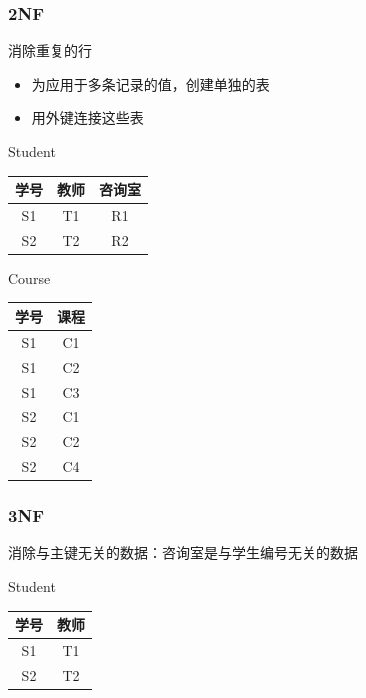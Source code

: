 \documentclass[11pt,journal,compsoc]{IEEEtran}
\begin{document}
\subsubsection{2NF}

消除重复的行

\begin{itemize}
    \item 为应用于多条记录的值，创建单独的表
    \item 用外键连接这些表
\end{itemize}

Student

\begin{table}[H]
    \centering
    \begin{tabular}{|c|c|c|}
        \hline
        学号 & 教师 & 咨询室 \\
        \hline
        S1 & T1 & R1 \\
        \hline
        S2 & T2 & R2 \\
        \hline
    \end{tabular}
\end{table}

Course

\begin{table}[H]
    \centering
    \begin{tabular}{|c|c|}
        \hline
        学号 & 课程 \\
        \hline
        S1 & C1 \\
        \hline
        S1 & C2 \\
        \hline
        S1 & C3 \\
        \hline
        S2 & C1 \\
        \hline
        S2 & C2 \\
        \hline
        S2 & C4 \\
        \hline
    \end{tabular}
\end{table}


\subsubsection{3NF}

消除与主键无关的数据：咨询室是与学生编号无关的数据

Student

\begin{table}[H]
    \centering
    \begin{tabular}{|c|c|}
        \hline
        学号 & 教师 \\
        \hline
        S1 & T1 \\
        S2 & T2 \\
        \hline
    \end{tabular}
\end{table}
\end{document}
